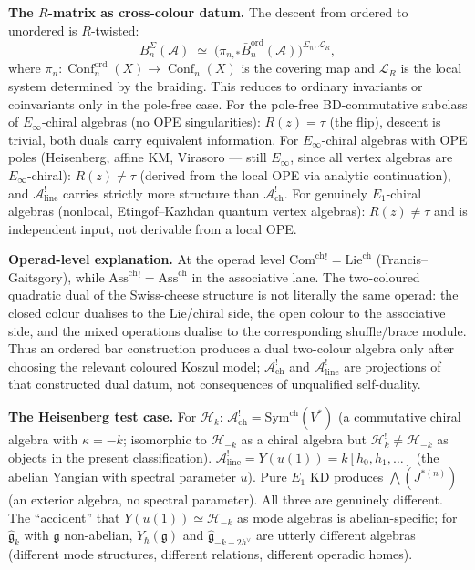 \documentclass[11pt]{article}
\newcommand{\cA}{\mathcal{A}}
\newcommand{\cH}{\mathcal{H}}
\newcommand{\fg}{\mathfrak{g}}
\DeclareMathOperator{\Conf}{Conf}
\begin{document}
\medskip\noindent\textbf{The $R$-matrix as cross-colour datum.}\enspace
The descent from ordered to unordered is $R$-twisted:
\[
B^\Sigma_n(\cA)
\;\simeq\;
\bigl(\pi_{n,*}\bar{B}^{\mathrm{ord}}_n(\cA)\bigr)
^{\Sigma_n,\mathcal{L}_R},
\]
where $\pi_n:\Conf_n^{\mathrm{ord}}(X)\to\Conf_n(X)$ is the
covering map and $\mathcal{L}_R$ is the local system determined
by the braiding.  This reduces to ordinary invariants or
coinvariants only in the pole-free case.
For the pole-free BD-commutative subclass of
$E_\infty$-chiral algebras (no OPE singularities):
$R(z) = \tau$ (the flip), descent is trivial, both
duals carry equivalent information.  For
$E_\infty$-chiral algebras with OPE poles
(Heisenberg, affine KM, Virasoro --- still $E_\infty$,
since all vertex algebras are $E_\infty$-chiral):
$R(z) \neq \tau$ (derived from the local OPE via
analytic continuation), and $\cA^!_{\mathrm{line}}$
carries strictly more structure than
$\cA^!_{\mathrm{ch}}$.  For genuinely $E_1$-chiral
algebras (nonlocal, Etingof--Kazhdan quantum vertex
algebras): $R(z) \neq \tau$ and is independent
input, not derivable from a local OPE.

\medskip\noindent\textbf{Operad-level explanation.}\enspace
At the operad level
$\mathrm{Com}^{\mathrm{ch}}{}^! = \mathrm{Lie}^{\mathrm{ch}}$
(Francis--Gaitsgory), while
$\mathrm{Ass}^{\mathrm{ch}}{}^! = \mathrm{Ass}^{\mathrm{ch}}$
in the associative lane.  The two-coloured quadratic dual of the
Swiss-cheese structure is not literally the same operad: the
closed colour dualises to the Lie/chiral side, the open colour to
the associative side, and the mixed operations dualise to the
corresponding shuffle/brace module.  Thus an ordered bar
construction produces a dual two-colour algebra only after choosing
the relevant coloured Koszul model; $\cA^!_{\mathrm{ch}}$ and
$\cA^!_{\mathrm{line}}$ are projections of that constructed dual
datum, not consequences of unqualified self-duality.

\medskip\noindent\textbf{The Heisenberg test case.}\enspace
For $\cH_k$: $\cA^!_{\mathrm{ch}} = \mathrm{Sym}^{\mathrm{ch}}(V^*)$
(a commutative chiral algebra with $\kappa = -k$;
isomorphic to $\cH_{-k}$ as a chiral algebra but
$\cH_k^! \neq \cH_{-k}$ as objects in the present classification).
$\cA^!_{\mathrm{line}} = Y(u(1)) = k[h_0, h_1, \ldots]$
(the abelian Yangian with spectral parameter $u$).
Pure $E_1$ KD produces $\bigwedge(J^{*(n)})$ (an exterior algebra,
no spectral parameter).  All three are genuinely different.
The ``accident'' that $Y(u(1)) \simeq \cH_{-k}$ as mode algebras
is abelian-specific; for $\widehat{\fg}_k$ with $\fg$ non-abelian,
$Y_\hbar(\fg)$ and $\widehat{\fg}_{-k-2h^\vee}$ are utterly
different algebras (different mode structures, different relations,
different operadic homes).
\end{document}
